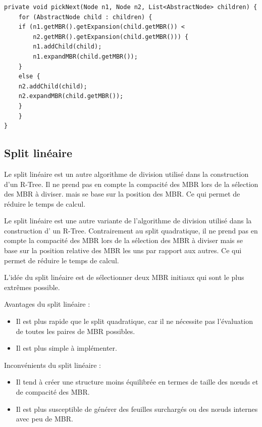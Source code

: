\documentclass {article}
\begin{document}
\begin{verbatim}
private void pickNext(Node n1, Node n2, List<AbstractNode> children) {
    for (AbstractNode child : children) {
	if (n1.getMBR().getExpansion(child.getMBR()) < 
		n2.getMBR().getExpansion(child.getMBR())) {
	    n1.addChild(child);
	    n1.expandMBR(child.getMBR());
	} 
	else {
	n2.addChild(child);
	n2.expandMBR(child.getMBR());
	}
    }
}

\end{verbatim}



\subsection {Split linéaire}

Le split linéaire est un autre algorithme de division utilisé dans la construction d'un R-Tree. 
Il ne prend pas en compte la compacité des MBR lors de la sélection des MBR à diviser.
mais se base sur la position des MBR. Ce qui permet de réduire le temps de calcul.

Le split linéaire est une autre variante de l'algorithme de division utilisé dans la construction d'
un R-Tree. 
Contrairement au split quadratique, il ne prend pas en compte la compacité des MBR lors de la 
sélection des MBR à diviser mais se base sur la position relative des MBR les uns par rapport 
aux autres. 
Ce qui permet de réduire le temps de calcul.

L'idée du split linéaire est de sélectionner deux MBR initiaux qui sont le plus extrêmes possible.

Avantages du split linéaire :

\begin{itemize}
    \item Il est plus rapide que le split quadratique, car il ne nécessite pas l'évaluation de
	toutes les paires de MBR possibles.
    \item Il est plus simple à implémenter.

\end{itemize}
Inconvénients du split linéaire :

\begin{itemize}
    \item Il tend à créer une structure moins équilibrée en termes de taille des nœuds et de
	compacité des MBR.
    \item Il est plus susceptible de générer des feuilles surchargés ou des nœuds internes
	avec peu de MBR.

\end{itemize}
\end{document}
